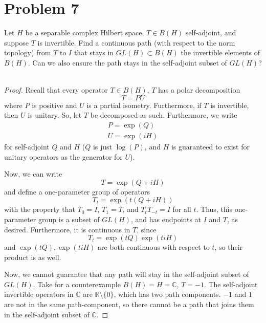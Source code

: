 \documentclass[fontsize=11pt]{scrartcl} %
\numberwithin{equation}{section} %
\numberwithin{figure}{section} %
\numberwithin{table}{section} %
\newcommand{\R}{\mathbb{R}}
\newcommand{\C}{\mathbb{C}}
\begin{document}
\newpage

\section*{Problem 7}
Let $H$ be a separable complex Hilbert space, $T\in B(H)$ self-adjoint, and
suppose $T$ is invertible. Find a continuous path (with respect to the norm
topology) from $T$ to $I$ that stays in $GL(H)\subset B(H)$ the invertible
elements of $B(H)$. Can we also ensure the path stays in the self-adjoint subset
of $GL(H)$?
\\
\\
\begin{proof}
    Recall that every operator $T\in B(H)$, $T$ has a polar decomposition
    \[
        T=PU
    \]
    where $P$ is positive and $U$ is a partial isometry. Furthermore, if $T$ is
    invertible, then $U$ is unitary. So, let $T$ be decomposed as such.
    Furthermore, we write
    \[
        \begin{aligned}
            P=\exp(Q)\\
            U=\exp(iH)
        \end{aligned}
    \]
    for self-adjoint $Q$ and $H$ ($Q$ is just $\log(P)$, and $H$ is guaranteed
    to exist for unitary operators as the generator for $U$).

    Now, we can write
    \[
        T = \exp(Q+iH)
    \]
    and define a one-parameter group of operators
    \[
        T_t = \exp(t(Q+iH))
    \]
    with the property that $T_0 = I$, $T_1=T$, and $T_tT_{-t}=I$ for all $t$.
    Thus, this one-parameter group is a subset of $GL(H)$, and has endpoints at
    $I$ and $T$, as desired. Furthermore, it is continuous in $T$, since
    \[
        T_t = \exp(tQ)\exp(tiH)
    \]
    and $\exp(tQ),\exp(tiH)$ are both continuous with respect to $t$, so their
    product is as well.

    Now, we cannot guarantee that any path will stay in the self-adjoint subset
    of $GL(H)$. Take for a counterexample $B(H)=H=\C$, $T=-1$. The self-adjoint
    invertible operators in $\C$ are $\R\setminus\{0\}$, which has two path
    components. $-1$ and $1$ are not in the same path-component, so there cannot
    be a path that joins them in the self-adjoint subset of $\C$.
\end{proof}

\newpage
\end{document}
